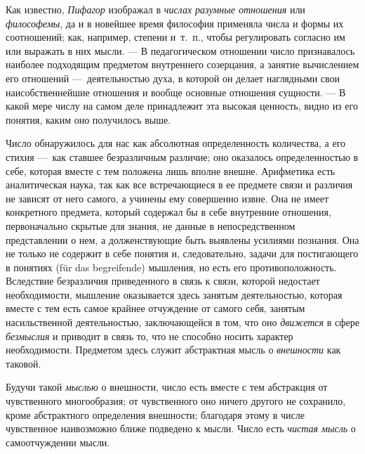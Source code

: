 Как известно, {\em Пифагор} изображал в
{\em числах разумные отношения} или
{\em философемы}, да и в новейшее время философия
применяла числа и формы их соотношений; как, например, степени и~т.~п.,
чтобы регулировать согласно им или выражать в них мысли. — В педагогическом
отношении число признавалось наиболее подходящим предметом внутреннего
созерцания, а занятие вычислением его отношений —~деятельностью духа, в
которой он делает наглядными свои наисобственнейшие отношения и вообще
основные отношения сущности. — В какой мере числу на самом деле принадлежит
эта высокая ценность, видно из его понятия, каким оно получилось выше.

Число обнаружилось для нас как абсолютная определенность количества, а его
стихия —~как ставшее безразличным различие; оно оказалось определенностью в
себе, которая вместе с тем положена лишь вполне внешне. Арифметика есть
аналитическая наука, так как все встречающиеся в ее предмете связи и
различия не зависят от него самого, а учинены ему совершенно извне. Она не
имеет конкретного предмета, который содержал бы в себе внутренние
отношения, первоначально скрытые для знания, не данные в непосредственном
представлении о нем, а долженствующие быть выявлены усилиями познания. Она
не только не содержит в себе понятия и, следовательно, задачи для
постигающего в понятиях (für das begreifende) мышления, но есть его
противоположность. Вследствие безразличия приведенного в связь к связи,
которой недостает необходимости, мышление оказывается здесь занятым
деятельностью, которая вместе с тем есть самое крайнее отчуждение от самого
себя, занятым насильственной деятельностью, заключающейся в том, что оно
{\em движется} в сфере
{\em безмыслия} и приводит в связь то, что не способно
носить характер необходимости. Предметом здесь служит абстрактная мысль о
{\em внешности} как таковой.

Будучи такой {\em мыслью} о внешности,
число есть вместе с тем абстракция от чувственного многообразия; от
чувственного оно ничего другого не сохранило, кроме абстрактного
определения внешности; благодаря этому в числе чувственное наивозможно
ближе подведено к мысли. Число есть {\em чистая мысль}
о самоотчуждении мысли.

